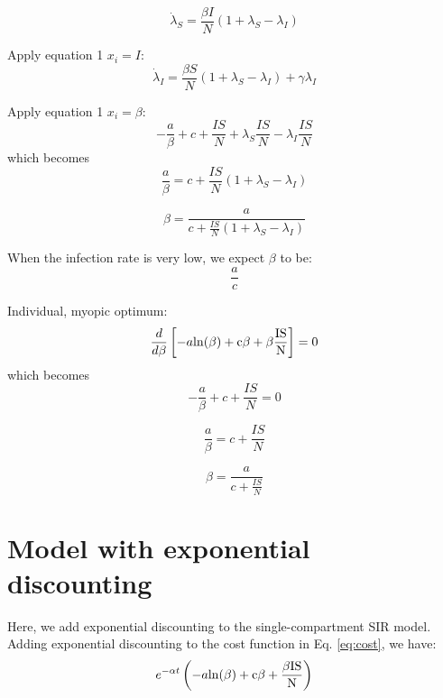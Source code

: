 \documentclass[11pt]{article} %
\begin{document}
\begin{equation}
\dot{\lambda}_S = \frac{\beta I}{N}(1 + \lambda_S-\lambda_I)
\end{equation}

Apply equation 1 $x_i = I$:
\begin{equation}
\dot{\lambda}_I = \frac{\beta S}{N}(1+\lambda_S-\lambda_I)+\gamma \lambda_I
\end{equation}

Apply equation 1 $x_i = \beta$:
\begin{equation}
-\frac{a}{\beta}+c+\frac{IS}{N}+\lambda_S \frac{IS}{N}-\lambda_I \frac{IS}{N}
\end{equation}
which becomes
\begin{equation}
\frac{a}{\beta} = c + \frac{IS}{N}(1+\lambda_S-\lambda_I)
\end{equation}

\begin{equation}
\beta = \frac{a}{c+\frac{IS}{N}(1+\lambda_S-\lambda_I)}
\end{equation}


When the infection rate is very low, we expect $\beta$ to be:
\begin{equation}
\frac{a}{c}
\end{equation}


Individual, myopic optimum: 
\begin{equation}
\frac{d}{d \beta}\left[-a\rm{ln}({\beta})+c\beta+\beta\frac{ IS}{N}\right] = 0
\end{equation}
which becomes 
\begin{equation}
-\frac{a}{\beta}+c+\frac{IS}{N} = 0
\end{equation}

\begin{equation}
\frac{a}{\beta} = c+\frac{IS}{N}
\end{equation}

\begin{equation}
\beta = \frac{a}{c+\frac{IS}{N}}
\end{equation}


\section{Model with exponential discounting}
Here, we add exponential discounting to the single-compartment SIR model. 
Adding exponential discounting to the cost function in Eq. \ref{eq:cost}, we have:
\begin{equation}
e^{-\alpha t}\left(-a\rm{ln}({\beta})+c\beta+\frac{\beta IS}{N}\right)
\end{equation}
\end{document}
